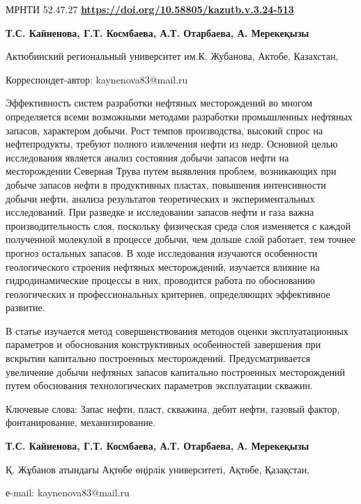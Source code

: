 \newpage
МРНТИ 52.47.27
\hfill {\bfseries \href{https://doi.org/10.58805/kazutb.v.3.24-513}{https://doi.org/10.58805/kazutb.v.3.24-513}}


\begin{center}
{\bfseries Т.С. Кайненова\envelope, Г.Т. Космбаева, А.Т. Отарбаева, А.
Мерекеқызы}

Актюбинский региональный университет им.К. Жубанова, Актобе, Казахстан,
\end{center}
\envelope Корреспондет-автор: kaynenova83@mail.ru


Эффективность систем разработки нефтяных месторождений во многом
определяется всеми возможными методами разработки промышленных нефтяных
запасов, характером добычи. Рост темпов производства, высокий спрос на
нефтепродукты, требуют полного извлечения нефти из недр. Основной целью
исследования является анализ состояния добычи запасов нефти на
месторождении Северная Трува путем выявления проблем, возникающих при
добыче запасов нефти в продуктивных пластах, повышения интенсивности
добычи нефти, анализа результатов теоретических и экспериментальных
исследований. При разведке и исследовании запасов нефти и газа важна
производительность слоя, поскольку физическая среда слоя изменяется с
каждой полученной молекулой в процессе добычи, чем дольше слой работает,
тем точнее прогноз остальных запасов. В ходе исследования изучаются
особенности геологического строения нефтяных месторождений, изучается
влияние на гидродинамические процессы в них, проводится работа по
обоснованию геологических и профессиональных критериев, определяющих
эффективное развитие.

В статье изучается метод совершенствования методов оценки
эксплуатационных параметров и обоснования конструктивных особенностей
завершения при вскрытии капитально построенных месторождений.
Предусматривается увеличение добычи нефтяных запасов капитально
построенных месторождений путем обоснования технологических параметров
эксплуатации скважин.

Ключевые слова: Запас нефти, пласт, скважина, дебит нефти, газовый
фактор, фонтанирование, механизирование.


\begin{center}
{\bfseries Т.С. Кайненова\envelope, Г.Т. Космбаева, А.Т.
Отарбаева, А. Мерекеқызы}

Қ. Жұбанов атындағы Ақтөбе өңірлік университеті, Ақтөбе, Қазақстан,

е-mail: kaynenova83@mail.ru
\end{center}

